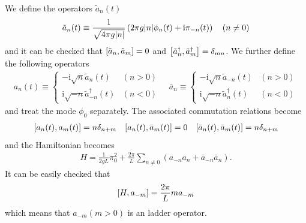 \documentclass[10pt]{article}
\newcommand{\ii}{\mathrm{i}}
\begin{document}
We define the operators $\tilde{a}_n(t)$
\begin{align}
    \tilde{a}_n(t)\equiv\frac{1}{\sqrt{4\pi g\abs{n}}}\left(2\pi g\abs{n}\phi_n(t)+\ii\pi_{-n}(t)\right)\quad(n\neq0)\label{eq:operator:boson:origin_ladder}
\end{align}
and it can be checked that $\comm{\tilde{a}_n}{\tilde{a}_m}=0$ and $\comm{\tilde{a}_n^\dagger}{\tilde{a}_m^\dagger}=\delta_{mn}$.
We further define the following operators
\begin{align}
    a_n(t)\equiv\begin{cases}
                    -\ii\sqrt{n}\tilde{a}_n(t)            & (n>0) \\
                    \ii\sqrt{-n}\tilde{a}^\dagger_{-n}(t) & (n<0)
                \end{cases}
    \quad
    \bar{a}_n\equiv\begin{cases}
                       -\ii \sqrt{n}\tilde{a}_{-n}(t)      & (n>0) \\
                       \ii \sqrt{-n}\tilde{a}_n^\dagger(t) & (n<0)
                   \end{cases}\label{eq:operator:boson:new_ladder}
\end{align}
and treat the mode $\phi_0$ separately.
The associated commutation relations become
\begin{align}
    \comm{a_n(t)}{a_m(t)}=n\delta_{n+m}\quad\comm{a_n(t)}{\bar{a}_m(t)}=0\quad\comm{\bar{a}_n(t)}{\bar{a}_m(t)}=n\delta_{n+m}
\end{align}
and the Hamiltonian becomes
\begin{align}
    H=\frac{1}{2gL}\pi_0^2+\frac{2\pi}{L}\sum_{n\neq0}\left(a_{-n}a_n+\bar{a}_{-n}\bar{a}_n\right).
\end{align}
It can be easily checked that
\begin{align}
    \comm{H}{a_{-m}}=\frac{2\pi}{L}ma_{-m}
\end{align}
which means that $a_{-m} (m>0)$ is an ladder operator.
\end{document}
